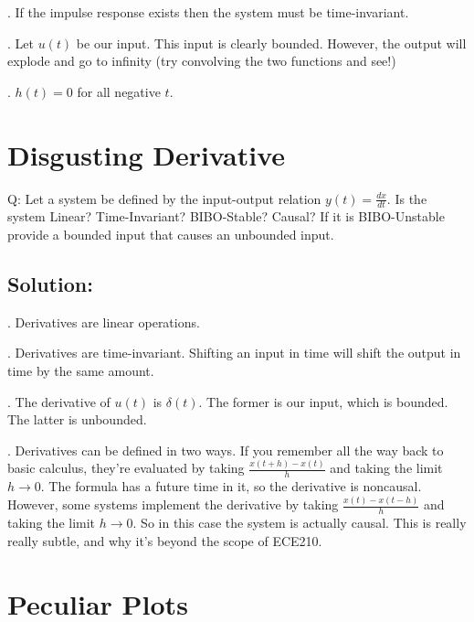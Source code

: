 \documentclass{article}
\begin{document}
. If the impulse response exists then the system must be time-invariant.

. Let $u(t)$ be our input. This input is clearly bounded. However, the output will explode and go to infinity (try convolving the two functions and see!)

. $h(t) = 0$ for all negative $t$.

\vspace{2cm}

\section{Disgusting Derivative}

Q: Let a system be defined by the input-output relation $y(t) = \frac{dx}{dt}$. Is the system Linear? Time-Invariant? BIBO-Stable? Causal? If it is BIBO-Unstable provide a bounded input that causes an unbounded input.

\subsection{Solution:}

. Derivatives are linear operations.

. Derivatives are time-invariant. Shifting an input in time will shift the output in time by the same amount.

. The derivative of $u(t)$ is $\delta(t)$. The former is our input, which is bounded. The latter is unbounded.
 
. Derivatives can be defined in two ways. If you remember all the way back to basic calculus, they're evaluated by taking $\frac{x(t + h) - x(t)}{h}$ and taking the limit $h \rightarrow 0$. The formula has a future time in it, so the derivative is noncausal. However, some systems implement the derivative by taking $\frac{x(t) - x(t - h)}{h}$ and taking the limit $h \rightarrow 0$. So in this case the system is actually causal. This is really really subtle, and why it's beyond the scope of ECE210.

\newpage

\section{Peculiar Plots}
\end{document}
